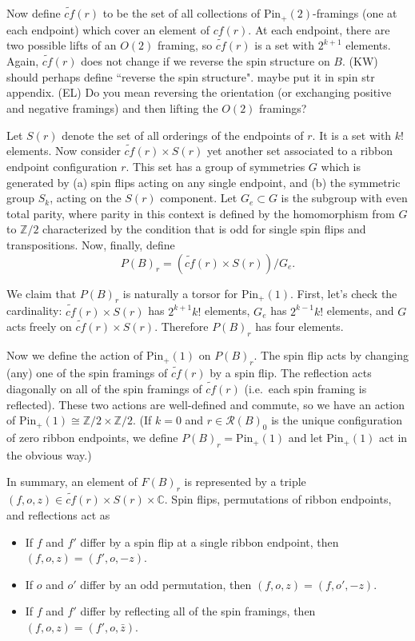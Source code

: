 \documentclass[12pt,a4paper]{article}
\newcommand{\zz}{\mathbb{Z}}
\newcommand{\cc}{\mathbb{C}}
\newcommand{\mcr}{\mathcal{R}}
\newcommand\be            {\begin{equation}}
\newcommand\ee            {\end{equation}}
\newcommand{\spin}{\text{Spin}}
\newcommand{\pin}{\text{Pin}}	%
\newcommand{\kw}[1]{{\color{kwcolor}\footnotesize{(KW) #1}}}
\newcommand{\ethan}[1]{{\color{amethyst}\footnotesize{(EL) #1}}}
\begin{document}
\newcommand{\tcf}{\widetilde{cf}}

Now define $\tcf(r)$ to be the set of all collections of $\pin_+(2)$-framings (one at each endpoint)
which cover an element of $cf(r)$.
At each endpoint, there are two possible lifts of an $O(2)$ framing, 
so $\tcf(r)$ is a set with $2^{k+1}$ elements.
Again, $\tcf(r)$ does not change if we reverse the spin structure on $B$.
\kw{should perhaps define ``reverse the spin structure".  maybe put it in spin str appendix.}
\ethan{Do you mean reversing the orientation (or exchanging positive and negative framings) and then lifting the $O(2)$ framings?}

Let $S(r)$ denote the set of all orderings of the endpoints of $r$.
It is a set with $k!$ elements.
Now consider $\tcf(r) \times S(r)$ yet another set associated to a ribbon endpoint configuration $r$.
This set has a group of symmetries $G$ which is generated by (a) spin flips acting on any single endpoint, 
and (b) the symmetric group $S_k$, acting on the $S(r)$ component.
Let $G_e \subset G$ is the subgroup with even total parity, where 
parity in this context is defined by the homomorphism from $G$ to $\zz/2$
characterized by the condition that is odd for single spin flips and transpositions.
Now, finally, define
\be
	P(B)_r = (\tcf(r) \times S(r))/G_e .
\ee

We claim that $P(B)_r$ is naturally a torsor for $\pin_+(1)$.
First, let's check the cardinality:
$\tcf(r) \times S(r)$ has $2^{k+1} k!$ elements,
$G_e$ has $2^{k-1} k!$ elements, and $G$ acts freely on $\tcf(r) \times S(r)$.
Therefore $P(B)_r$ has four elements.

Now we define the action of $\pin_+(1)$ on $P(B)_r$.
The spin flip acts by changing (any) one of the spin framings of $\tcf(r)$ by a spin flip.
The reflection acts diagonally on all of the spin framings of $\tcf(r)$
(i.e.\ each spin framing is reflected).
These two actions are well-defined and commute, so we have
an action of $\pin_+(1) \cong \zz/2\times\zz/2$.
(If $k = 0$ and $r \in \mcr(B)_0$ is the unique configuration of zero ribbon endpoints,
we define $P(B)_r = \pin_+(1)$ and let $\pin_+(1)$ act in the obvious way.)

\medskip

In summary, an element of $F(B)_r$ is represented by a triple $(f, o, z) \in \tcf(r) \times S(r) \times \cc$.
Spin flips, permutations of ribbon endpoints, and reflections act as
\begin{itemize}
\item If $f$ and $f'$ differ by a spin flip at a single ribbon endpoint, then $(f, o, z) = (f', o, -z)$.
\item If $o$ and $o'$ differ by an odd permutation, then $(f, o, z) = (f, o', -z)$.
\item If $f$ and $f'$ differ by reflecting all of the spin framings, then $(f, o, z) = (f', o, \bar z)$.
\end{itemize}
\end{document}
